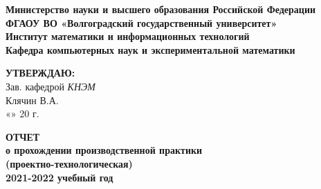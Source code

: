 \documentclass[12pt,a4paper]{scrartcl}
\begin{document}
	\begin{center}
		\textbf{Министерство науки и высшего образования Российской Федерации} \\
		\textbf{ФГАОУ ВО «Волгоградский государственный университет»} \\
		\textbf{Институт математики и информационных технологий} \\
		\textbf{Кафедра компьютерных наук и экспериментальной математики} \\
		
		\vspace{0.6cm}
		
		\hfill\begin{minipage}{0.4\textwidth}
		\begin{flushright}
			\textbf{\textsc{УТВЕРЖДАЮ:}} \\
			Зав. кафедрой \textit{КНЭМ} \\
			Клячин В.А.\\
			«\underline{\hspace{0.7cm}}» \underline{\hspace{3cm}} 20\underline{\hspace{0.7cm}} г.
		\end{flushright}
		\end{minipage}
		
		\vspace{0.6cm}
		
		\textbf{
			ОТЧЕТ\\о прохождении производственной практики\\(проектно-технологическая)\\2021-2022 учебный год
			\vspace{0.2cm}
		}
		
		\vspace{0.3cm}
		\renewcommand{\arraystretch}{1.5} %
		

\end{center}
\end{document}
